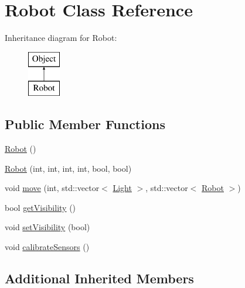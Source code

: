 \hypertarget{classRobot}{\section{Robot Class Reference}
\label{classRobot}
}
Inheritance diagram for Robot\-:\begin{figure}[H]
\begin{center}
\leavevmode
\includegraphics[height=2.000000cm]{classRobot}
\end{center}
\end{figure}
\subsection*{Public Member Functions}
\begin{DoxyCompactItemize}
\item 
\hyperlink{classRobot_a4fc7c70ae20623f05e06f2ecb388b6c4}{Robot} ()
\item 
\hyperlink{classRobot_ae5751bb09af47b300059ad88cf830650}{Robot} (int, int, int, int, bool, bool)
\item 
void \hyperlink{classRobot_a393633b2e58bc48b09ca2f2e9cf84108}{move} (int, std\-::vector$<$ \hyperlink{classLight}{Light} $>$, std\-::vector$<$ \hyperlink{classRobot}{Robot} $>$)
\item 
bool \hyperlink{classRobot_abaf127f5ec8d6e467ccd5f27cc414d82}{get\-Visibility} ()
\item 
void \hyperlink{classRobot_a541eaf13131cccaf00c41809a3495cc8}{set\-Visibility} (bool)
\item 
void \hyperlink{classRobot_a5bc90f1b4c8a73a39595cda1439ba992}{calibrate\-Sensors} ()
\end{DoxyCompactItemize}
\subsection*{Additional Inherited Members}


